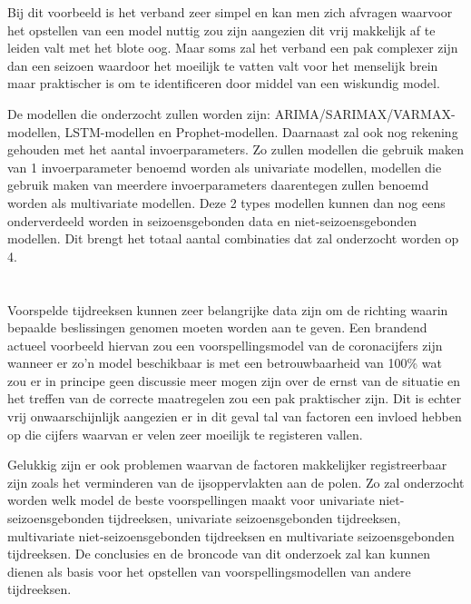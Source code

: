 Bij dit voorbeeld is het verband zeer simpel en kan men zich afvragen waarvoor het opstellen van een model nuttig zou zijn aangezien dit vrij makkelijk af te leiden valt met het blote oog. Maar soms zal het verband een pak complexer zijn dan een seizoen waardoor het moeilijk te vatten valt voor het menselijk brein maar praktischer is om te identificeren door middel van een wiskundig model. 

De modellen die onderzocht zullen worden zijn: ARIMA/SARIMAX/VARMAX-modellen, LSTM-modellen en Prophet-modellen. Daarnaast zal ook nog rekening gehouden met het aantal invoerparameters. Zo zullen modellen die gebruik maken van 1 invoerparameter benoemd worden als univariate modellen, modellen die gebruik maken van meerdere invoerparameters daarentegen zullen benoemd worden als multivariate modellen. Deze 2 types modellen kunnen dan nog eens onderverdeeld worden in seizoensgebonden data en niet-seizoensgebonden modellen. Dit brengt het totaal aantal combinaties dat zal onderzocht worden op 4.

\section{}
\label{sec:probleemstelling}

Voorspelde tijdreeksen kunnen zeer belangrijke data zijn om de richting waarin bepaalde beslissingen genomen moeten worden aan te geven. Een brandend actueel voorbeeld hiervan zou een voorspellingsmodel van de coronacijfers zijn wanneer er zo'n model beschikbaar is met een betrouwbaarheid van 100\% wat zou er in principe geen discussie meer mogen zijn over de ernst van de situatie en het treffen van de correcte maatregelen zou een pak praktischer zijn. Dit is echter vrij onwaarschijnlijk aangezien er in dit geval tal van factoren een invloed hebben op die cijfers waarvan er velen zeer moeilijk te registeren vallen. 

Gelukkig zijn er ook problemen waarvan de factoren makkelijker registreerbaar zijn zoals het verminderen van de ijsoppervlakten aan de polen. Zo zal onderzocht worden welk model de beste voorspellingen maakt voor univariate niet-seizoensgebonden tijdreeksen, univariate seizoensgebonden tijdreeksen, multivariate niet-seizoensgebonden tijdreeksen en multivariate seizoensgebonden tijdreeksen. De conclusies en de broncode van dit onderzoek zal kan kunnen dienen als basis voor het opstellen van voorspellingsmodellen van andere tijdreeksen.


